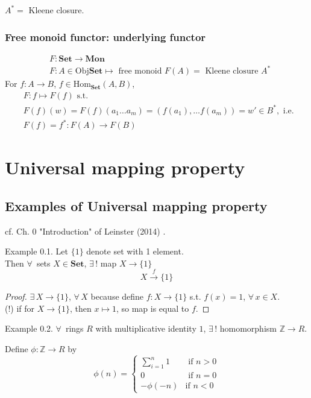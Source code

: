 $A^* = $ Kleene closure.

\subsubsection{Free monoid functor: underlying functor}

\[
\begin{aligned}
& F: \textbf{Set} \to \textbf{Mon} \\
& F: A \in \text{Obj}\textbf{Set} \mapsto \text{ free monoid } F(A) = \text{ Kleene closure } A^* 
\end{aligned}
\]
For $f:A \to B$, $f\in \text{Hom}_{\textbf{Set}}(A, B)$, 
\[
\begin{aligned}
& F: f\mapsto F(f) \text{ s.t. } \\
& F(f)(w) = F(f)(a_1 \dots a_m) = (f(a_1), \dots f(a_m)) = w' \in B^*, \text{ i.e. } \\
& F(f) = f^* : F(A) \to F(B)
\end{aligned}
\]


\section{Universal mapping property}

\subsection{Examples of Universal mapping property}

cf. Ch. 0 "Introduction" of Leinster (2014) \cite{agat:Lein2014}.

Example 0.1. Let $\lbrace 1 \rbrace$ denote set with 1 element. \\
Then $\forall \, $ sets $X \in \textbf{Set}$, $\exists \, ! $ map $X \to \lbrace 1 \rbrace$
\[
X \xrightarrow{ f} \lbrace 1 \rbrace 
\]

\begin{proof}
$\exists \, X \to \lbrace 1 \rbrace$, $\forall \, X$ because define $f: X \to \lbrace 1 \rbrace$ s.t. $f(x) = 1$, $\forall \, x \in X$. \\
(!) if for $X \to \lbrace 1 \rbrace$, then $x\mapsto 1$, so map is equal to $f$.
\end{proof} 

Example 0.2. $\forall \, $ rings $R$ with multiplicative identity $1$, $\exists \, !$ homomorphism $\mathbb{Z} \to R$. \label{agat:Example:integerringhomomorphism}

Define $\phi : \mathbb{Z} \to R$ by 
\[
\phi(n) = \begin{cases}  \sum_{i=1}^n 1 & \text{ if } n > 0 \\ 
0 & \text{ if } n = 0 \\
-\phi(-n) & \text{if } n < 0 \end{cases} 
\]

